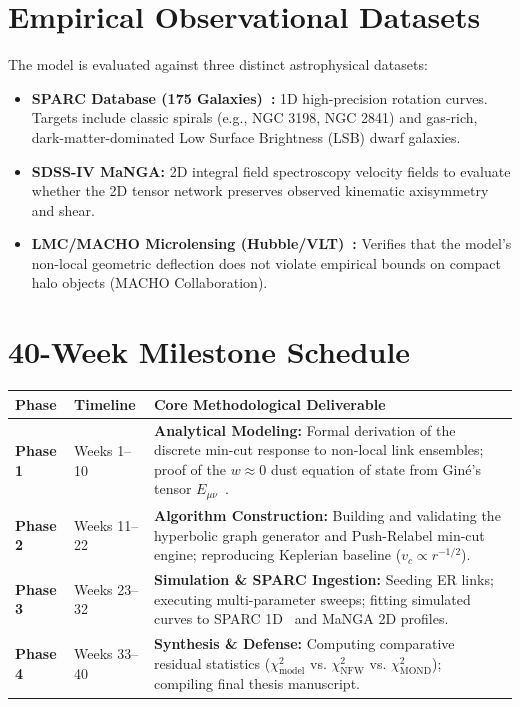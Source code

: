\documentclass[10pt,a4paper]{article}
\begin{document}
\section{Empirical Observational Datasets}
\label{sec:data}

The model is evaluated against three distinct astrophysical datasets:
\begin{itemize}\setlength{\itemsep}{1pt}
    \item \textbf{SPARC Database (175 Galaxies)~\cite{sparc2016}:} 1D high-precision rotation curves. Targets include classic spirals (e.g., NGC 3198, NGC 2841) and gas-rich, dark-matter-dominated Low Surface Brightness (LSB) dwarf galaxies.
    \item \textbf{SDSS-IV MaNGA:} 2D integral field spectroscopy velocity fields to evaluate whether the 2D tensor network preserves observed kinematic axisymmetry and shear.
    \item \textbf{LMC/MACHO Microlensing (Hubble/VLT)~\cite{macho2001}:} Verifies that the model's non-local geometric deflection does not violate empirical bounds on compact halo objects (MACHO Collaboration).
\end{itemize}

\section{40-Week Milestone Schedule}
\label{sec:schedule}

\begin{table}[htbp]
\centering
\small
\begin{tabularx}{\textwidth}{llX}
\toprule
\textbf{Phase} & \textbf{Timeline} & \textbf{Core Methodological Deliverable} \\
\midrule
\textbf{Phase 1} & Weeks 1--10 & \textbf{Analytical Modeling:} Formal derivation of the discrete min-cut response to non-local link ensembles; proof of the $w \approx 0$ dust equation of state from Gin\'e's tensor $E_{\mu\nu}$~\cite{gine2026}. \\
\textbf{Phase 2} & Weeks 11--22 & \textbf{Algorithm Construction:} Building and validating the hyperbolic graph generator and Push-Relabel min-cut engine; reproducing Keplerian baseline ($v_c \propto r^{-1/2}$). \\
\textbf{Phase 3} & Weeks 23--32 & \textbf{Simulation \& SPARC Ingestion:} Seeding ER links; executing multi-parameter sweeps; fitting simulated curves to SPARC 1D~\cite{sparc2016} and MaNGA 2D profiles. \\
\textbf{Phase 4} & Weeks 33--40 & \textbf{Synthesis \& Defense:} Computing comparative residual statistics ($\chi^2_{\text{model}}$ vs. $\chi^2_{\text{NFW}}$ vs. $\chi^2_{\text{MOND}}$); compiling final thesis manuscript. \\
\bottomrule
\end{tabularx}
\end{table}
\end{document}
